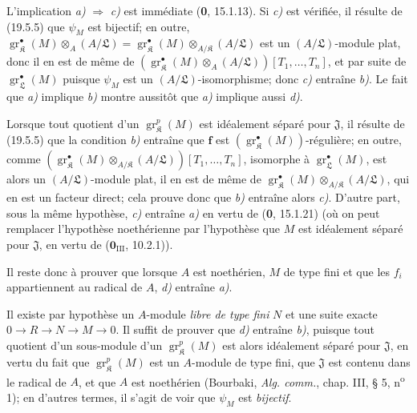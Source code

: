 L'implication \emph{a)} $\Rightarrow$ \emph{c)} est immédiate (\textbf{0}, 15.1.13). Si \emph{c)} est vérifiée, il résulte de (19.5.5) que $\psi_M$ est bijectif; en outre, $\operatorname{gr}_{\mathfrak K}^\bullet(M)\otimes_A(A/\mathfrak L)=\operatorname{gr}_{\mathfrak K}^\bullet(M)\otimes_{A/\mathfrak K}(A/\mathfrak L)$ est un $(A/\mathfrak L)$-module plat, donc il en est de même de $(\operatorname{gr}_{\mathfrak K}^\bullet(M)\otimes_A(A/\mathfrak L))[T_1,\ldots,T_n]$, et par suite de $\operatorname{gr}_{\mathfrak L}^\bullet(M)$ puisque $\psi_M$ est un $(A/\mathfrak L)$-isomorphisme; donc \emph{c)} entraîne \emph{b)}. Le fait que \emph{a)} implique \emph{b)} montre aussitôt que \emph{a)} implique aussi \emph{d)}.

Lorsque tout quotient d'un $\operatorname{gr}_{\mathfrak K}^p(M)$ est idéalement séparé pour $\mathfrak J$, il résulte de (19.5.5) que la condition \emph{b)} entraîne que $\mathbf f$ est $(\operatorname{gr}_{\mathfrak K}^\bullet(M))$-régulière; en outre, comme $(\operatorname{gr}_{\mathfrak K}^\bullet(M)\otimes_{A/\mathfrak K}(A/\mathfrak L))[T_1,\ldots,T_n]$, isomorphe à $\operatorname{gr}_{\mathfrak L}^\bullet(M)$, est alors un $(A/\mathfrak L)$-module plat, il en est de même de $\operatorname{gr}_{\mathfrak K}^\bullet(M)\otimes_{A/\mathfrak K}(A/\mathfrak L)$, qui en est un facteur direct; cela prouve donc que \emph{b)} entraîne alors \emph{c)}. D'autre part, sous la même hypothèse, \emph{c)} entraîne \emph{a)} en vertu de (\textbf{0}, 15.1.21) (où on peut remplacer l'hypothèse noethérienne par l'hypothèse que $M$ est idéalement séparé pour $\mathfrak J$, en vertu de ($\mathbf{0}_{\mathrm{III}}$, 10.2.1)).

Il reste donc à prouver que lorsque $A$ est noethérien, $M$ de type fini et que les $f_i$ appartiennent au radical de $A$, \emph{d)} entraîne \emph{a)}.

Il existe par hypothèse un $A$-module \emph{libre de type fini} $N$ et une suite exacte $0\to R\to N\to M\to0$. Il suffit de prouver que \emph{d)} entraîne \emph{b)}, puisque tout quotient d'un sous-module d'un $\operatorname{gr}_{\mathfrak K}^p(M)$ est alors idéalement séparé pour $\mathfrak J$, en vertu du fait que $\operatorname{gr}_{\mathfrak K}^p(M)$ est un $A$-module de type fini, que $\mathfrak J$ est contenu dans le radical de $A$, et que $A$ est noethérien (Bourbaki, \emph{Alg. comm.}, chap. III, § 5, n\textsuperscript{o} 1); en d'autres termes, il s'agit de voir que $\psi_M$ est \emph{bijectif}.

